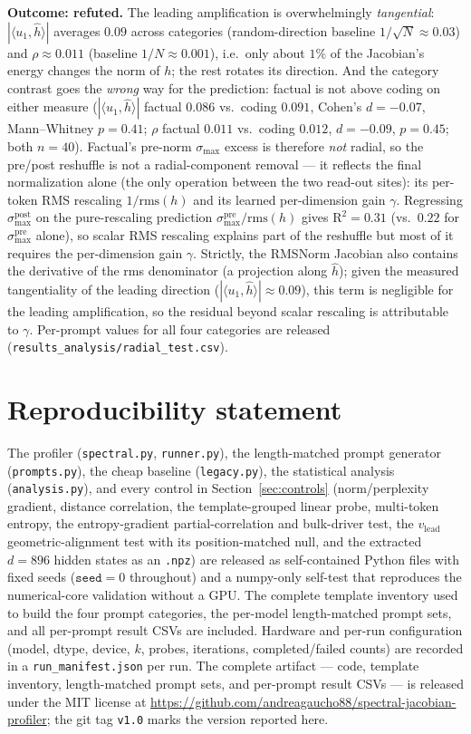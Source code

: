 \documentclass{article}
\begin{document}
\textbf{Outcome: refuted.} The leading amplification is overwhelmingly \emph{tangential}:
$|\langle u_1,\hat h\rangle|$ averages $0.09$ across categories (random-direction baseline
$1/\sqrt{N}\!\approx\!0.03$) and $\rho\approx0.011$ (baseline $1/N\!\approx\!0.001$), i.e.\ only about
$1\%$ of the Jacobian's energy changes the norm of $h$; the rest rotates its direction. And the
category contrast goes the \emph{wrong} way for the prediction: factual is not above coding on either
measure ($|\langle u_1,\hat h\rangle|$ factual $0.086$ vs.\ coding $0.091$, Cohen's $d=-0.07$,
Mann--Whitney $p=0.41$; $\rho$ factual $0.011$ vs.\ coding $0.012$, $d=-0.09$, $p=0.45$; both
$n=40$). Factual's pre-norm $\sigma_{\max}$ excess is therefore \emph{not} radial, so the pre/post
reshuffle is not a radial-component removal --- it reflects the final normalization alone (the only operation between the two read-out sites): its
per-token RMS rescaling $1/\mathrm{rms}(h)$ and its learned per-dimension gain $\gamma$. Regressing
$\sigma_{\max}^{\mathrm{post}}$ on the pure-rescaling prediction $\sigma_{\max}^{\mathrm{pre}}/\mathrm{rms}(h)$
gives $\mathrm{R}^2=0.31$ (vs.\ $0.22$ for $\sigma_{\max}^{\mathrm{pre}}$ alone), so scalar RMS rescaling
explains part of the reshuffle but most of it requires the per-dimension gain $\gamma$. Strictly, the
RMSNorm Jacobian also contains the derivative of the rms denominator (a projection along $\hat h$);
given the measured tangentiality of the leading direction ($|\langle u_1,\hat h\rangle|\approx0.09$),
this term is negligible for the leading amplification, so the residual beyond scalar rescaling is
attributable to $\gamma$. Per-prompt values for all four categories are released
(\texttt{results\_analysis/radial\_test.csv}).

\section*{Reproducibility statement}
The profiler (\texttt{spectral.py}, \texttt{runner.py}), the length-matched prompt generator
(\texttt{prompts.py}), the cheap baseline (\texttt{legacy.py}), the statistical analysis
(\texttt{analysis.py}), and every control in Section~\ref{sec:controls} (norm/perplexity gradient,
distance correlation, the template-grouped linear probe, multi-token entropy, the entropy-gradient
partial-correlation and bulk-driver test, the $v_{\mathrm{lead}}$ geometric-alignment test with its
position-matched null, and the extracted $d{=}896$ hidden states as an \texttt{.npz}) are released as self-contained
Python files with fixed seeds ($\texttt{seed}=0$ throughout) and a numpy-only self-test that reproduces the
numerical-core validation without a GPU. The complete template inventory used to build the four
prompt categories, the per-model length-matched prompt sets, and all per-prompt result CSVs are
included. Hardware and per-run configuration (model, dtype, device, $k$, probes, iterations,
completed/failed counts) are recorded in a \texttt{run\_manifest.json} per run. The complete artifact
--- code, template inventory, length-matched prompt sets, and per-prompt result CSVs --- is released
under the MIT license at \url{https://github.com/andreagaucho88/spectral-jacobian-profiler}; the
git tag \texttt{v1.0} marks the version reported here.



\end{document}

